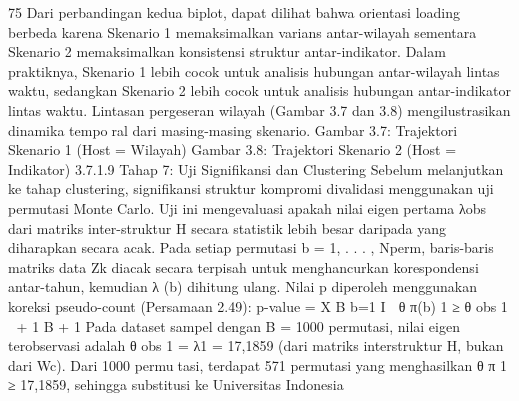 75
Dari perbandingan kedua biplot, dapat dilihat bahwa orientasi loading berbeda karena
Skenario 1 memaksimalkan varians antar-wilayah sementara Skenario 2 memaksimalkan
konsistensi struktur antar-indikator. Dalam praktiknya, Skenario 1 lebih cocok untuk
analisis hubungan antar-wilayah lintas waktu, sedangkan Skenario 2 lebih cocok untuk
analisis hubungan antar-indikator lintas waktu.
Lintasan pergeseran wilayah (Gambar 3.7 dan 3.8) mengilustrasikan dinamika temporal dari masing-masing skenario.
Gambar 3.7: Trajektori Skenario 1 (Host =
Wilayah)
Gambar 3.8: Trajektori Skenario 2 (Host =
Indikator)
3.7.1.9 Tahap 7: Uji Signifikansi dan Clustering
Sebelum melanjutkan ke tahap clustering, signifikansi struktur kompromi divalidasi
menggunakan uji permutasi Monte Carlo. Uji ini mengevaluasi apakah nilai eigen pertama
λobs dari matriks inter-struktur H secara statistik lebih besar daripada yang diharapkan
secara acak. Pada setiap permutasi b = 1, . . . , Nperm, baris-baris matriks data Zk diacak
secara terpisah untuk menghancurkan korespondensi antar-tahun, kemudian λ
(b) dihitung
ulang. Nilai p diperoleh menggunakan koreksi pseudo-count (Persamaan 2.49):
p-value =
X
B
b=1
I

θ
π(b)
1 ≥ θ
obs
1

+ 1
B + 1
Pada dataset sampel dengan B = 1000 permutasi, nilai eigen terobservasi adalah
θ
obs
1 = λ1 = 17,1859 (dari matriks interstruktur H, bukan dari Wc). Dari 1000 permutasi, terdapat 571 permutasi yang menghasilkan θ
π
1 ≥ 17,1859, sehingga substitusi ke
Universitas Indonesia

